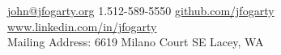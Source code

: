 \documentclass[10pt,letterpaper]{article}
\begin{document}
\sloppy  %



\nobreakvspace{0.3em}  %

\noindent\href{mailto:john.at.jfogarty.dot.org}{john\mbox{}@\mbox{}jfogarty.org}\sbull
\textsmaller{+}1.512-589-5550\sbull
\href{https://github.com/jfogarty}{github.com/jfogarty}
\sbull
\href{http://www.linkedin.com/in/jfogarty}{www.linkedin.com/in/jfogarty}
\\
Mailing Address: 6619 Milano Court SE\sbull
Lacey, WA

\spacedhrule{0.9em}{-0.4em}  %

\end{document}
